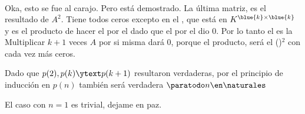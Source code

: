 \begin{enumerate}[label=(\alph*)]
$$\begin{array}{rcl}
{            }
          \end{array}
        $$
        Oka, esto se fue al carajo.
        Pero está demostrado.
        La última matriz, es el resultado de $A^2$. Tiene todos ceros excepto en el , que está en $K^{\blue{k} \times \blue{k}}$ y es
        el producto de hacer el  por el  dado que el  por el  dio 0.
        Por lo tanto el  es la \red{!!!} Multiplicar $k+1$ veces $A$ por si misma dará 0, porque el producto,
        será el ()$^2$ con cada vez más ceros.
\end{enumerate}

Dado que $p(2), p(k) \ytext p(k+1)$ resultaron verdaderas, por el principio de inducción en $p(n)$ también será verdadera  $\paratodo n \en \naturales$

El caso con $n=1$ es trivial, dejame en paz.

\begin{aportes}
  \item {}
\end{aportes}
